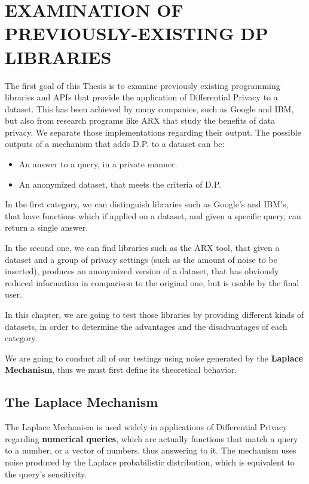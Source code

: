 \chapter{EXAMINATION OF PREVIOUSLY-EXISTING DP LIBRARIES}

The first goal of this Thesis is to examine previously existing programming libraries and APIs that provide the application of Differential Privacy to a dataset. This has been achieved by many companies, such as Google and IBM, but also from research programs like ARX that study the benefits of data privacy. We separate those implementations regarding their output. The possible outputs of a mechanism that adds D.P. to a dataset can be:
\begin{itemize}
    \item An answer to a query, in a private manner.
    \item An anonymized dataset, that meets the criteria of D.P.
\end{itemize}

In the first category, we can distinguish libraries such as Google's and IBM's, that have functions which if applied on a dataset, and given a specific query, can return a single answer.

In the second one, we can find libraries such as the ARX tool, that given a dataset and a group of privacy settings (such as the amount of noise to be inserted), produces an anonymized version of a dataset, that has obviously reduced information in comparison to the original one, but is usable by the final user.

In this chapter, we are going to test those libraries by providing different kinds of datasets, in order to determine the advantages and the disadvantages of each category.

We are going to conduct all of our testings using noise generated by the \textbf{Laplace Mechanism}, thus we must first define its theoretical behavior.



\section{The Laplace Mechanism}

The Laplace Mechanism is used widely in applications of Differential Privacy regarding \textbf{numerical queries}, which are actually functions that match a query to a number, or a vector of numbers, thus answering to it. The mechanism uses noise produced by the Laplace probabilistic distribution, which is equivalent to the query's sensitivity.

